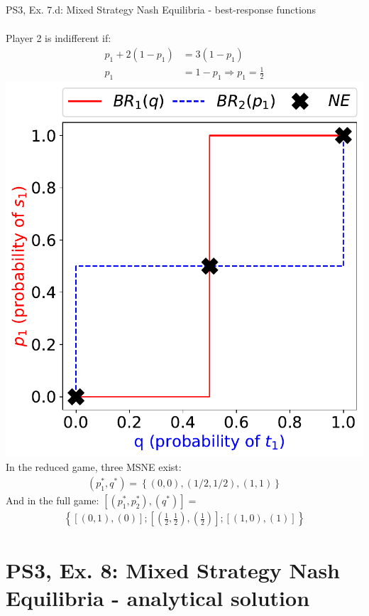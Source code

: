 \begin{frame}{PS3, Ex. 7.d: Mixed Strategy Nash Equilibria - best-response functions}
\begin{multicols}{2}
\begin{align*}
    \end{align*}
    Player 2 is indifferent if:
    \vspace{-4pt}
    \begin{align*}
      p_1 + 2(1-p_1)  &= 3(1-p_1) \\
      p_1             &= 1-p_1 \Rightarrow p_1 = \frac{1}{2}
    \end{align*}
  \vfill\null \columnbreak
    \includegraphics[width=\columnwidth]{figures/5d2}
    In the reduced game, three MSNE exist:
    \begin{align*}
      (p_1^{*},q^{*})=\left\{(0,0),(1/2,1/2),(1,1)\right\}
    \end{align*}
    And in the full game: $\left[(p_1^{*},p_2^{*}),(q^{*})\right]=$
    \begin{align*}
      \left\{\left[(0,1),(0)\right];\left[\left(\frac{1}{2},\frac{1}{2}\right),\left(\frac{1}{2}\right)\right];\left[(1,0),(1)\right]\right\}
    \end{align*}
  \vfill\null
  \end{multicols}
\end{frame}


\section{PS3, Ex. 8: Mixed Strategy Nash Equilibria - analytical solution}

